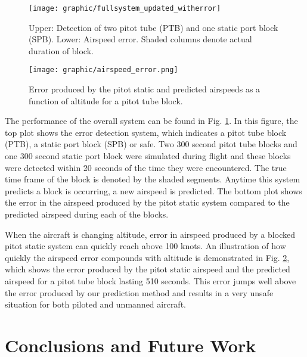 \documentclass[]{aiaa-tc}
\begin{document}
\begin{figure}[t]
\centering
\texttt{[image: graphic/fullsystem\_updated\_witherror]}
\caption{\label{fig:fullsystem} Upper: Detection of two pitot tube (PTB) and one static port block (SPB). Lower: Airspeed error. Shaded columns denote actual duration of block.}
\end{figure}
\begin{figure}[h!]
\centering
\texttt{[image: graphic/airspeed\_error.png]}
\caption[Airspeed error during pitot tube block]{Error produced by the pitot static and predicted airspeeds as a function of altitude for a pitot tube block.}
\label{fig:error1}
\end{figure}
\newpage
The performance of the overall system can be found in Fig. \ref{fig:fullsystem}. In this figure, the top plot shows the error detection system, which indicates a pitot tube block (PTB), a static port block (SPB) or safe. Two 300 second pitot tube blocks and one 300 second static port block were simulated during flight and these blocks were detected within 20 seconds of the time they were encountered. The true time frame of the block is denoted by the shaded segments. Anytime this system predicts a block is occurring, a new airspeed is predicted. The bottom plot shows the error in the airspeed produced by the pitot static system compared to the predicted airspeed during each of the blocks.

When the aircraft is changing altitude, error in airspeed produced by a blocked pitot static system can quickly reach above 100 knots. An illustration of how quickly the airspeed error compounds with altitude is demonstrated in Fig. \ref{fig:error1}, which shows the error produced by the pitot static airspeed and the predicted airspeed for a pitot tube block lasting 510 seconds. This error jumps well above the error produced by our prediction method and results in a very unsafe situation for both piloted and unmanned aircraft.   



\section{Conclusions and Future Work}
\label{sec:conclusion}
\end{document}
